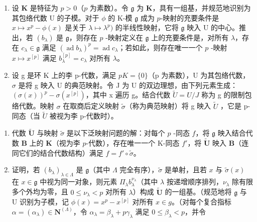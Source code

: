 \begin{enumerate}
\def\labelenumi{\arabic{enumi}.}
\setcounter{enumi}{4}
\item
  设 \(\mathbf{K}\) 是特征为 \(p > 0\)（\(p\) 为素数）。令 \(\mathfrak{g}\) 为 \(\mathbf{K}\)，具有一组基，并规范地识别为其包络代数 U 的子模。对于 \(\phi\) 的 K-模 \(\mathfrak{g}\) 成为 \(p\)-映射的充要条件是 \(x \mapsto x^p - \phi(x)\) 是关于 \(\lambda \mapsto \lambda^p)\) 的半线性映射，它将 \(\mathfrak{g}\) 映入 U 的中心。推出，若 \((b_{\lambda})\) 是 \(\mathfrak{g}\)，则存在 \(p\) -映射定义在 \(\mathfrak{g}\) 上的充要条件是，对所有 \(\lambda\)，存在 \(c_{\lambda} \in \mathfrak{g}\) 满足 \((\operatorname{ad} b_{\lambda})^p = \operatorname{ad} c_{\lambda}\)；若如此，则存在唯一一个 \(p\) -映射 \(x \mapsto x^{[p]}\) 满足 \(b_{\lambda}^{[p]} = c_{\lambda}\) 对所有 \(\lambda\)。
\item
  设 g 是环 K 上的李 p-代数，满足 \(pK = \{0\}\)（p 为素数），U 为其包络代数，\(\sigma\) 是将 g 映入 U 的典范映射。令 J 为 U 的双边理想，由下列元素生成：\((\sigma(x))^{p} - \sigma(x^{[p]})\)，其中 x 遍历 g。结合代数 \(\tilde{U} = U/J\) 称为 g 的限制包络代数。映射 \(\sigma\) 在取商后定义映射 \(\tilde{\sigma}\)（称为典范映射）将 g 映入 \(\tilde{U}\) ，它是 p-同态（当 \(\tilde{U}\) 被视为李 p-代数时）。
\end{enumerate}

\begin{enumerate}
\def\labelenumi{(\alph{enumi})}
\item
  代数 \(\tilde{\mathbf{U}}\) 与映射 \(\tilde{\sigma}\) 是以下泛映射问题的解：对每个 \(p\) -同态 \(f\)，将 \(\mathfrak{g}\) 映入结合代数 \(\mathbf{B}\) 上的 \(\mathbf{K}\)（视为李 \(p\)-代数），存在唯一一个 K-同态 \(f'\)，将 \(\tilde{\mathbf{U}}\) 映入 \(\mathbf{B}\)（连同它们的结合代数结构）满足 \(f = f' \circ \tilde{\sigma}\)。
\item
  证明，若 \((b_{\lambda})_{\lambda \in \Lambda}\) 是 \(\mathfrak{g}\)（其中 \(\Lambda\) 完全有序），\(\tilde{\sigma}\) 是单射，且若 \(x\) 与 \(\tilde{\sigma}(x)\) 在 \(x\in \mathfrak{g}\) 中视为同一对象，则元素 \(\Pi_{\lambda}b_{\lambda}^{\nu_{\lambda}}\)（其中 \(\lambda\) 按递增顺序排列，\(\nu_{\lambda}\) 除有限多个外均为零，且 \(0\leqslant \nu_{\lambda} < p\) 对所有 \(\lambda\)）构成 \(\tilde{\mathbf{U}}\) 的一组基。（规范地将 \(\mathfrak{g}\) 与 \(\mathrm{U}\) 识别为子模，记 \(\phi (x) = x^{p} - x^{[p]}\) 对所有 \(x\in g\)。（对每个复合指标 \(\alpha = (\alpha_{\lambda})\in \mathbf{N}^{(\Lambda)}\)，令 \(\alpha_{\lambda} = \beta_{\lambda} + p\gamma_{\lambda}\) 满足 \(0\leqslant \beta_{\lambda} < p\)，并令
\end{enumerate}


